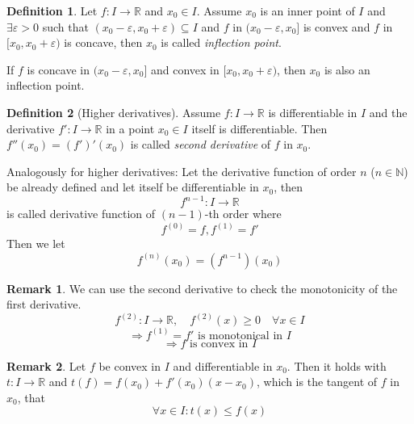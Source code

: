 \documentclass[a4paper,landscape,twocolumn]{article}
\theoremstyle{definition}
\newtheorem{defi}{Definition}
\newtheorem{rem}{Remark}
\begin{document}
\begin{defi}
  Let $f: I \to \mathbb R$ and $x_0 \in I$. Assume $x_0$ is an inner point of $I$
  and $\exists \varepsilon > 0$ such that $(x_0 - \varepsilon, x_0 + \varepsilon) \subseteq I$
  and $f$ in $(x_0 - \varepsilon, x_0]$ is convex and $f$ in $[x_0, x_0 + \varepsilon)$ is concave,
  then $x_0$ is called \emph{inflection point}.

  If $f$ is concave in $(x_0 - \varepsilon, x_0]$ and convex in $[x_0, x_0 + \varepsilon)$,
  then $x_0$ is also an inflection point.
\end{defi}
%
\begin{defi}[Higher derivatives]
  Assume $f: I \to \mathbb R$ is differentiable in $I$ and the derivative
  $f': I \to \mathbb R$ in a point $x_0 \in I$ itself is differentiable.
  Then $f''(x_0) = (f')'(x_0)$ is called \emph{second derivative} of $f$ in $x_0$.

  Analogously for higher derivatives:
  Let the derivative function of order $n$ ($n \in \mathbb N$) be already defined
  and let itself be differentiable in $x_0$, then
  \[ f^{n-1}: I \to \mathbb R \]
  is called derivative function of $(n-1)$-th order where
  \[ f^{(0)} = f, f^{(1)} = f' \]
  Then we let
  \[ f^{(n)}(x_0) = \left(f^{n-1}\right)(x_0) \]
\end{defi}
%
\begin{rem}
  We can use the second derivative to check the monotonicity of the first derivative.
  \[ f^{(2)}: I \to \mathbb R, \quad f^{(2)}(x) \geq 0 \quad \forall x \in I \]
  \[ \Rightarrow f^{(1)} = f' \text{ is monotonical in $I$} \]
  \[ \Rightarrow f \text{ is convex in $I$} \]
\end{rem}
\begin{rem}
  Let $f$ be convex in $I$ and differentiable in $x_0$. Then it holds with
  $t: I \to \mathbb R$ and $t(f) = f(x_0) + f'(x_0) (x - x_0)$,
  which is the tangent of $f$ in $x_0$, that
  \[ \forall x \in I: t(x) \leq f(x) \]
\end{rem}
%
\end{document}
